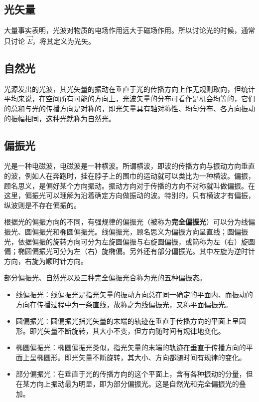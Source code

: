 
\begin{issues}
\issueDraft
\end{issues}


\subsection{光矢量}
大量事实表明，光波对物质的电场作用远大于磁场作用。所以讨论光的时候，通常只讨论 $\vec{E}$，将其定义为光矢。

\subsection{自然光}
光源发出的光波，其光矢量的振动在垂直于光的传播方向上作无规则取向，但统计平均来说，在空间所有可能的方向上，光波矢量的分布可看作是机会均等的，它们的总和与光的传播方向是对称的，即光矢量具有轴对称性、均匀分布、各方向振动的振幅相同，这种光就称为自然光。

\subsection{偏振光}

光是一种电磁波，电磁波是一种横波。所谓横波，即波的传播方向与振动方向垂直的波，例如人在奔跑时，挂在脖子上的围巾的运动就可以类比为一种横波。偏振，顾名思义，是偏好某个方向振动。振动方向对于传播的方向不对称就叫做偏振。在这里，偏振光可以理解为沿着确定方向做振动的波。特别的，只有横波才有偏振，纵波则是不存在偏振的。

根据光的偏振方向的不同，有强规律的偏振光（被称为\textbf{完全偏振光}）可以分为线偏振光、圆偏振光和椭圆偏振光。线偏振光，顾名思义为偏振方向呈直线；圆偏振光，依据偏振的旋转方向可分为左旋圆偏振与右旋圆偏振，或简称为左（右）旋圆偏；椭圆偏振光可分为左（右）旋椭偏。另外还有部分偏振光。其中左旋为逆时针方向，右旋为顺时针方向。

部分偏振光、自然光以及三种完全偏振光合称为光的五种偏振态。

\begin{itemize}
\item 线偏振光：线偏振光是指光矢量的振动方向总在同一确定的平面内、而振动的方向在传播过程中为一条直线，故称之为线偏振光，又称平面偏振光。
\item 圆偏振光：圆偏振光指光矢量的末端的轨迹在垂直于传播方向的平面上呈圆形。即光矢量不断旋转，其大小不变，但方向随时间有规律地变化。
\item 椭圆偏振光：椭圆偏振光类似，指光矢量的末端的轨迹在垂直于传播方向的平面上呈椭圆形。即光矢量不断旋转，其大小、方向都随时间有规律的变化。
\item 部分偏振光：在垂直于光的传播方向的这个平面上，含有各种振动的分量，但在某方向上振动最为明显，即为部分偏振光。这是自然光和完全偏振光的叠加。
\end{itemize}


